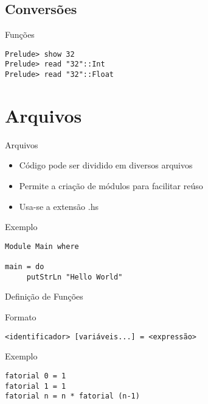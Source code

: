 \documentclass{beamer}
\begin{document}
		\subsection{Conversões}

			\begin{frame}[fragile]{Funções}
			 \begin{block}{}
			  \begin{lstlisting}
Prelude> show 32
Prelude> read "32"::Int
Prelude> read "32"::Float
			  \end{lstlisting}
			 \end{block}			 
			\end{frame}

	\section{Arquivos}
	
		\begin{frame}[fragile]{Arquivos}
		 \begin{itemize}
		  \item Código pode ser dividido em diversos arquivos
		  \item Permite a criação de módulos para facilitar reúso
		  \item Usa-se a extensão .hs
		 \end{itemize}
		 
		 \begin{block}{Exemplo}
		  \begin{lstlisting}
Module Main where

main = do
     putStrLn "Hello World"
		  \end{lstlisting}
		 \end{block}
		\end{frame}
		
		\begin{frame}[fragile]{Definição de Funções}
		 \begin{block}{Formato}
		  \begin{lstlisting}
<identificador> [variáveis...] = <expressão>
		  \end{lstlisting}
		 \end{block}
		 
		 \begin{block}{Exemplo}
		  \begin{lstlisting}
fatorial 0 = 1
fatorial 1 = 1
fatorial n = n * fatorial (n-1)
		  \end{lstlisting}
		 \end{block}
		\end{frame}
		
\end{document}
